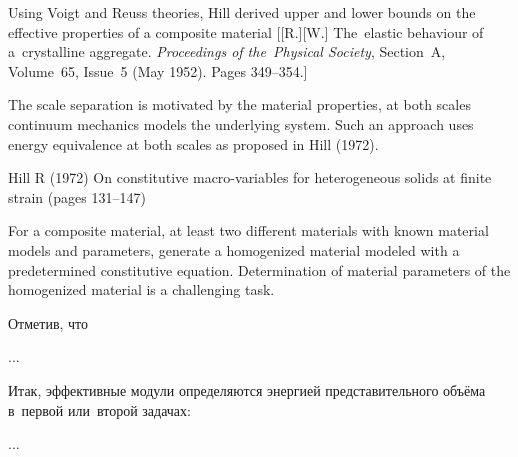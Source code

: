 \label{section:composites.hillsfork}

\begin{otherlanguage}{russian}

{\small
\noindent
Using Voigt and Reuss theories, Hill derived upper and lower bounds on the effective properties of a composite material [[R.][W.] The~elastic behaviour of a~crystalline aggregate. \emph{Proceedings of the~Physical Society}, Section~A, Volume~65, Issue~5 (May 1952). Pages 349\hbox{--}354.]

The scale separation is motivated by the material properties, at both scales continuum mechanics models the underlying system.
Such an approach uses energy equivalence at both scales as proposed in Hill (1972).

Hill R (1972) On constitutive macro-variables for heterogeneous solids at finite strain (pages 131–147)

For a composite material, at least two different materials with known material models and parameters, generate a homogenized material modeled with a predetermined constitutive equation. Determination of material parameters of the homogenized material is a challenging task.
\par}

Отметив, что

...



\end{otherlanguage}



\label{section:composites.eshelbyformulas}

\begin{otherlanguage}{russian}

Итак, эффективные модули определяются энергией представительного объёма в~первой или~второй задачах:

...



\end{otherlanguage}


